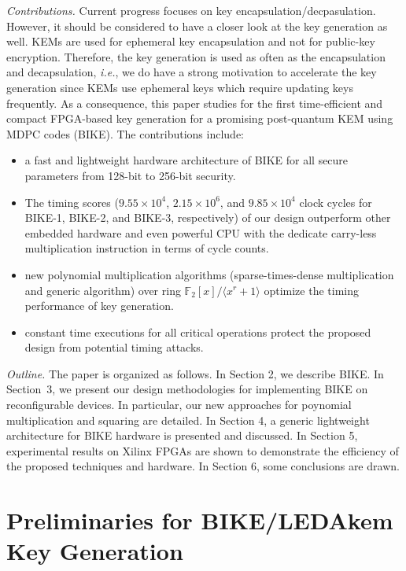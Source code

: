 \documentclass[runningheads]{llncs}
\begin{document}
\textit{Contributions.} Current progress focuses on key encapsulation/decpasulation. However, it should be considered to have a closer look at the
key generation as well. KEMs are used for ephemeral
key encapsulation and not for public-key encryption. Therefore, the key
generation is used as often as the encapsulation and decapsulation, \textit{i.e.},
we do have a strong motivation to accelerate the key generation since KEMs use ephemeral keys which require updating keys frequently.
As a consequence, this paper studies for the first time-efficient and compact FPGA-based key generation for a promising post-quantum KEM using MDPC codes (BIKE). The contributions include:
\begin{itemize}
  \item a fast and lightweight hardware architecture of BIKE for all secure parameters from 128-bit to 256-bit security.
  \item The timing scores ($9.55 \times 10^4$, $2.15 \times 10^6$, and $9.85 \times 10^4$ clock cycles for BIKE-1, BIKE-2, and BIKE-3, respectively) of our design outperform other embedded hardware and even powerful CPU with the dedicate carry-less multiplication instruction in terms of cycle counts.
  \item new polynomial multiplication algorithms (sparse-times-dense multiplication and generic algorithm) over ring $\mathbb{F}_2[x]/\langle x^r+1\rangle$ optimize the timing performance of key generation.
  \item constant time executions for all critical operations protect the proposed design from potential timing attacks.
\end{itemize}

\textit{Outline.} The paper is organized as follows. In Section 2, we describe BIKE. In Section~3, we present our design methodologies for implementing BIKE on reconfigurable devices. In particular, our new approaches for poynomial multiplication and squaring are detailed. In Section 4, a generic lightweight architecture for BIKE hardware is presented and discussed. In Section 5, experimental results on Xilinx FPGAs are shown to demonstrate the efficiency of the proposed techniques and hardware. In Section 6, some conclusions are drawn.

\section{Preliminaries for BIKE/LEDAkem Key Generation}
\end{document}
